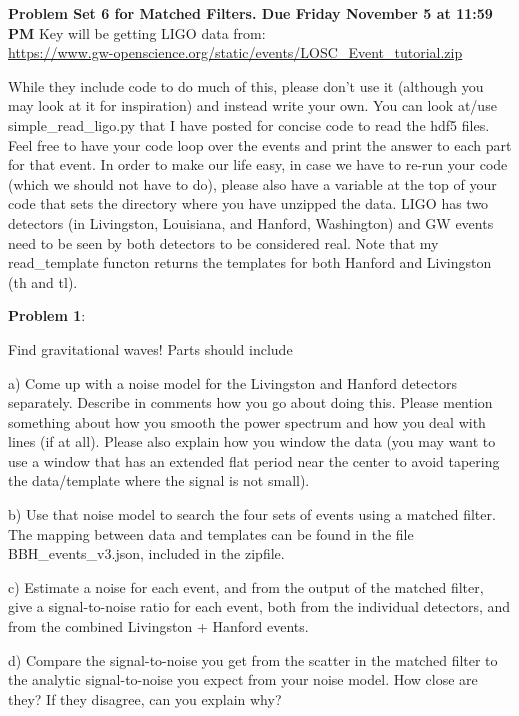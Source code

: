 \documentclass[11pt]{article}
\begin{document}
{\bf{Problem Set 6 for Matched Filters.  Due Friday November 5 at
    11:59 PM}}
\vskip 0.1in
Key will be getting LIGO data from:\\

{\small{
\url{https://www.gw-openscience.org/static/events/LOSC_Event_tutorial.zip}}}
\vskip 0.1in

While they include code to do much of this, please don't use it
(although you may look at it for inspiration) and instead write your
own.  You can look at/use simple\_read\_ligo.py that I have posted for
concise code to read the hdf5 files.  Feel free to have your code loop
over the events and print the answer to each part for that event.  In
order to make our life easy, in case we have to re-run your code
(which we should not have to do), please also have a variable at the
top of your code that sets the directory where you have unzipped the
data.  LIGO has two detectors (in Livingston, Louisiana, and Hanford,
Washington) and GW events need to be seen by both detectors to be
considered real.  Note that my read\_template functon returns the
templates for both Hanford and Livingston (th and tl).  


{\bf{Problem 1}}: 

Find gravitational waves!  Parts should include 

a) Come up with a noise model for the Livingston and Hanford detectors
separately.
Describe in comments how you go about doing this.  Please mention
something about how you smooth the power spectrum and how you deal
with lines (if at all).  Please also explain how you window the data
(you may want to use a window that has an extended flat period near
the center to avoid tapering the data/template where the signal is not small).

b) Use that noise model to search the four sets of events using a
matched filter.  The mapping between data and templates can be found
in the file BBH\_events\_v3.json, included in the zipfile.

c)  Estimate a noise for each event, and from the output of the
matched filter, give a signal-to-noise ratio for each event, both from
the individual detectors, and from the combined Livingston + Hanford
events.

d)  Compare the signal-to-noise you get from the scatter in the
matched filter to the analytic signal-to-noise you expect from your
noise model.  How close are they?  If they disagree, can you explain
why? 
\end{document}
